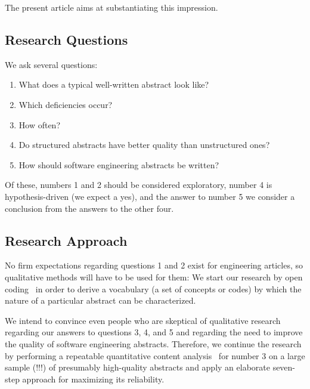 \documentclass[10pt,journal,compsoc]{IEEEtran}
\begin{document}
The present article aims at substantiating this impression.




\subsection{Research Questions}

\noindent
We ask several questions:
\begin{enumerate}
	\item What does a typical well-written abstract look like?
	\item Which deficiencies occur?
	\item How often?
	\item Do structured abstracts have better quality than unstructured ones?
	\item How should software engineering abstracts be written?
\end{enumerate}
Of these, numbers 1 and 2 should be considered exploratory,
number 4 is hypothesis-driven (we expect a yes), and
the answer to number 5 we consider a conclusion from the answers to the other four.


\subsection{Research Approach}

No firm expectations regarding questions 1 and 2 exist for engineering articles,
so qualitative methods will have to be used for them:
We start our research by open coding~\cite[Ch. 5]{StrCor90} in order to derive a vocabulary (a set of concepts or codes)
by which the nature of a particular abstract can be characterized.

We intend to convince even people who are skeptical of qualitative research
regarding our answers to questions 3, 4, and 5 and regarding the need to improve
the quality of software engineering abstracts.
Therefore, we continue the research by performing a repeatable
quantitative content analysis~\cite[Ch. 7]{Krippendorff04} for number 3
on a large sample (!!!) of presumably high-quality abstracts
and apply an elaborate seven-step approach for maximizing its reliability.
\end{document}
